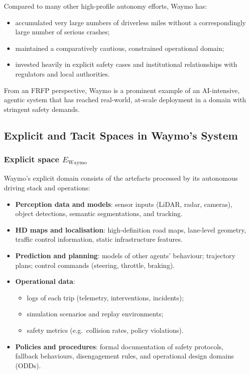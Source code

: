 Compared to many other high-profile autonomy efforts, Waymo has:

\begin{itemize}
  \item accumulated very large numbers of driverless miles without a
        correspondingly large number of serious crashes;
  \item maintained a comparatively cautious, constrained operational domain;
  \item invested heavily in explicit safety cases and institutional
        relationships with regulators and local authorities.
\end{itemize}

From an FRFP perspective, Waymo is a prominent example of an AI-intensive,
agentic system that has reached real-world, at-scale deployment in a domain
with stringent safety demands.

\subsection{Explicit and Tacit Spaces in Waymo’s System}

\subsubsection*{Explicit space \(E_{\mathrm{Waymo}}\)}

Waymo’s explicit domain consists of the artefacts processed by its
autonomous driving stack and operations:

\begin{itemize}
  \item \textbf{Perception data and models}:
        sensor inputs (LiDAR, radar, cameras), object detections, semantic
        segmentations, and tracking.
  \item \textbf{HD maps and localisation}:
        high-definition road maps, lane-level geometry, traffic control
        information, static infrastructure features.
  \item \textbf{Prediction and planning}:
        models of other agents’ behaviour; trajectory plans; control
        commands (steering, throttle, braking).
  \item \textbf{Operational data}:
        \begin{itemize}
          \item logs of each trip (telemetry, interventions, incidents);
          \item simulation scenarios and replay environments;
          \item safety metrics (e.g.\ collision rates, policy violations).
        \end{itemize}
  \item \textbf{Policies and procedures}:
        formal documentation of safety protocols, fallback behaviours,
        disengagement rules, and operational design domains (ODDs).
\end{itemize}

